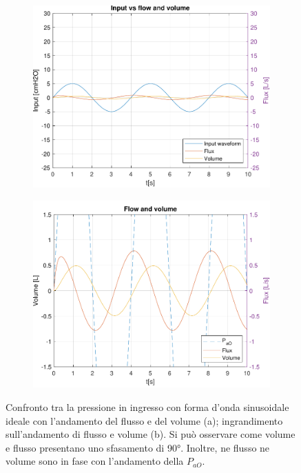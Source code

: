 \begin{figure}[t!]
\begin{subfigure}{0.5\linewidth}
	\centering
	\includegraphics[width=0.95\linewidth]{../model/data_log/data_sine_wave_freq_15.pdf}
	\caption{}
\end{subfigure}\hfill
\begin{subfigure}{0.5\linewidth}
	\centering
	\includegraphics[width=0.95\linewidth]{../model/data_log/data_sine_wave_freq_15_zoom.pdf}
	\caption{}
\end{subfigure}
\caption{Confronto tra la pressione in ingresso con forma d'onda sinusoidale ideale con l'andamento del flusso e del volume (a); ingrandimento sull'andamento di flusso e volume (b). Si può osservare come volume e flusso presentano uno sfasamento di 90°. Inoltre, ne flusso ne volume sono in fase con l'andamento della $P_{aO}$. }

\end{figure}
